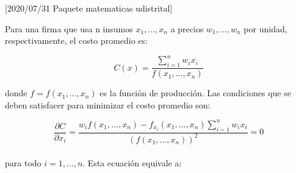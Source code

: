 [2020/07/31 Paquete matematicas udistrital]
\RequirePackage{xcolor, amssymb, amsmath, amsthm, fancyhdr, hyperref, graphicx, tikz, pgfplots, pgf, tkz-euclide, enumerate, float}

\pgfplotsset{width=7cm,compat=1.8}


\theoremstyle{plain}
\newtheorem{teorema}{Teorema}
\newtheorem*{teorema*}{Teorema}
\newtheorem{lema}{Lema}
\newtheorem{proposicion}{Proposición}
\newtheorem{corolario}{Corolario}
\theoremstyle{definition}
\newtheorem{definicion}{Definición}
\theoremstyle{remark}
\newtheorem{nota}{Nota}
\newtheorem{ejercicio}{Ejercicio}

\usepackage[spanish]{babel}

\usepackage{geometry}
\geometry{letterpaper,tmargin=4cm,bmargin=4cm,lmargin=2cm,
	rmargin=2cm, headheight=1cm,headsep=1cm,footskip=2cm}

\usepackage{kpfonts,baskervald}




\usepackage{etoolbox}
\usepackage{hyperref}
\patchcmd{\abstract}{\null\vfil}{}{}{}




Para una firma que usa n insumos $x_{1}, ..., x_{n}$ a precios $w_{1}, ..., w_{n}$ por unidad, respectivamente, el costo promedio es:

\[ C(x) = \frac{\sum_{i=1}^{n} w_{i}x_{i} }{f(x_{1}, ..., x_{n})}\]

donde $f = f(x_{1}, ..., x_{n})$  es la función de producción. Las condiciones que se deben satisfacer para minimizar el costo promedio son:

\[ \frac{\partial C}{\partial x_{i}} = \frac{w_{i}f(x_{1}, ..., x_{n}) - f_{x_{i}}(x_{1}, ..., x_{n}) \sum_{i=1}^{n} w_{i}x_{i}}{(f(x_{1}, ..., x_{n}))^{2}} = 0 \]
\\
para todo $i= 1, ..., n$.  Esta ecuación equivale a:

